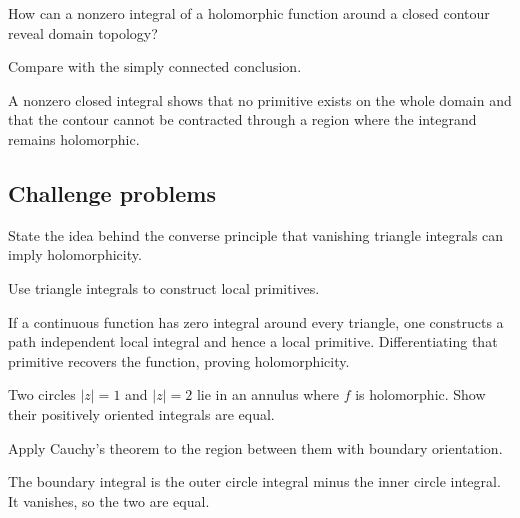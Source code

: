 \begin{exercise}\label{exr:iv05-expand-14}
How can a nonzero integral of a holomorphic function around a closed contour reveal domain topology?
\end{exercise}
\begin{hint}
Compare with the simply connected conclusion.
\end{hint}
\begin{solution}
A nonzero closed integral shows that no primitive exists on the whole domain and that the contour cannot be contracted through a region where the integrand remains holomorphic.
\end{solution}

\subsection*{Challenge problems}

\begin{exercise}\label{exr:iv05-expand-15}
State the idea behind the converse principle that vanishing triangle integrals can imply holomorphicity.
\end{exercise}
\begin{hint}
Use triangle integrals to construct local primitives.
\end{hint}
\begin{solution}
If a continuous function has zero integral around every triangle, one constructs a path independent local integral and hence a local primitive. Differentiating that primitive recovers the function, proving holomorphicity.
\end{solution}

\begin{exercise}\label{exr:iv05-expand-16}
Two circles \(|z|=1\) and \(|z|=2\) lie in an annulus where \(f\) is holomorphic. Show their positively oriented integrals are equal.
\end{exercise}
\begin{hint}
Apply Cauchy's theorem to the region between them with boundary orientation.
\end{hint}
\begin{solution}
The boundary integral is the outer circle integral minus the inner circle integral. It vanishes, so the two are equal.
\end{solution}

